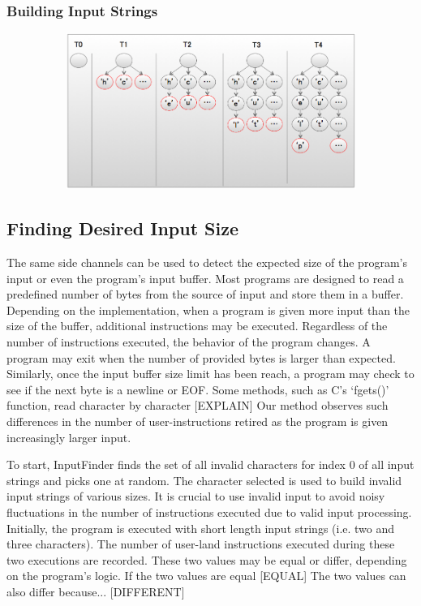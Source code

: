 \documentclass[10pt,twocolumn]{article}
\def \tool {InputFinder}
\begin{document}
\subsubsection{Building Input Strings}

\begin{figure}[t]
\centering
\includegraphics[height=2in,width=6.5in]{string_builder.png}
\label{fig:string_builder}
\caption{}
\end{figure}



\subsection{Finding Desired Input Size}

The same side channels can be used to detect the expected size of the program's input or even the program's input buffer.
Most programs are designed to read a predefined number of bytes from the source of input and store them in a buffer.
Depending on the implementation, when a program is given more input than the size of the buffer, additional instructions may be executed.
Regardless of the number of instructions executed, the behavior of the program changes.
A program may exit when the number of provided bytes is larger than expected.
Similarly, once the input buffer size limit has been reach, a program may check to see if the next byte is a newline or EOF.
Some methods, such as C's `fgets()' function, read character by character [EXPLAIN]
Our method observes such differences in the number of user-instructions retired as the program is given increasingly larger input.

To start, \tool{} finds the set of all invalid characters for index 0 of all input strings and picks one at random.
The character selected is used to build invalid input strings of various sizes.
It is crucial to use invalid input to avoid noisy fluctuations in the number of instructions executed due to valid input processing.
Initially, the program is executed with short length input strings (i.e. two and three characters).
The number of user-land instructions executed during these two executions are recorded.
These two values may be equal or differ, depending on the program's logic.
If the two values are equal [EQUAL]
The two values can also differ because... [DIFFERENT]
\end{document}
